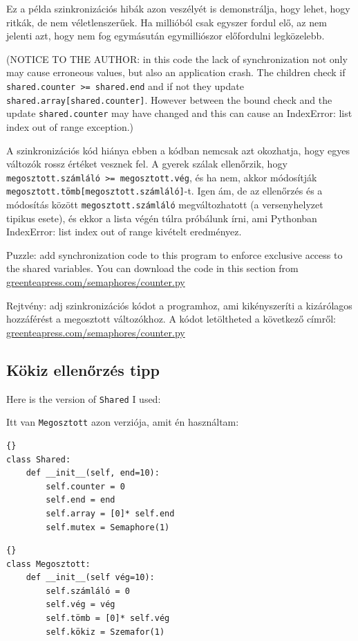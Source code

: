 \documentclass{book}
\newcommand{\clearemptydoublepage}{\newpage\cleardoublepage}
\begin{document}
Ez a példa szinkronizációs hibák azon veszélyét is demonstrálja,
hogy lehet, hogy ritkák, de nem véletlenszerűek. Ha millióból csak
egyszer fordul elő, az nem jelenti azt, hogy nem fog egymásután
egymilliószor előfordulni legközelebb.

(NOTICE TO THE AUTHOR: in this code the lack of synchronization not
only may cause erroneous values, but also an application crash.
The children check if {\tt shared.counter >= shared.end} and
if not they update {\tt shared.array[shared.counter]}. However
between the bound check and the update {\tt shared.counter}
may have changed and this can cause an IndexError: list index out of range
exception.)

A szinkronizációs kód hiánya ebben a kódban nemcsak azt okozhatja,
hogy egyes változók rossz értéket vesznek fel. A gyerek szálak
ellenőrzik, hogy {\tt megosztott.számláló >= megosztott.vég},
és ha nem, akkor módosítják {\tt megosztott.tömb[megosztott.számláló]}-t.
Igen ám, de az ellenőrzés és a módosítás között {\tt megosztott.számláló}
megváltozhatott (a versenyhelyzet tipikus esete), és ekkor
a lista végén túlra próbálunk írni, ami Pythonban
IndexError: list index out of range kivételt eredményez.

Puzzle: add synchronization code to this program to enforce
exclusive access to the shared variables.  You can download the
code in this section from \url{greenteapress.com/semaphores/counter.py}

Rejtvény: adj szinkronizációs kódot a programhoz, ami
kikényszeríti a kizárólagos hozzáférést a megosztott változókhoz.
A kódot letöltheted a következő címről:
\url{greenteapress.com/semaphores/counter.py}

\clearemptydoublepage
\subsection{Kökiz ellenőrzés tipp}

Here is the version of {\tt Shared} I used:

Itt van {\tt Megosztott} azon verziója, amit én használtam:

\begin{lstlisting}[title={}]{}
class Shared:
    def __init__(self, end=10):
        self.counter = 0
        self.end = end
        self.array = [0]* self.end
        self.mutex = Semaphore(1)
\end{lstlisting}


\begin{lstlisting}[title={Kökiz ellenőrzés tipp}]{}
class Megosztott:
    def __init__(self vég=10):
        self.számláló = 0
        self.vég = vég
        self.tömb = [0]* self.vég
        self.kökiz = Szemafor(1)
\end{lstlisting}
\end{document}
